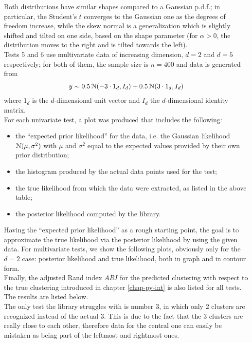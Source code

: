 Both distributions have similar shapes compared to a Gaussian p.d.f.; in particular, the Student's $t$ converges to the Gaussian one as the degrees of freedom increase, while the skew normal is a generalization which is slightly shifted and tilted on one side, based on the shape parameter (for $\alpha>0$, the distribution moves to the right and is tilted towards the left). \\
Tests 5 and 6 use multivariate data of increasing dimension, $d = 2$ and $d=5$ respectively; for both of them, the sample size is $n=400$ and data is generated from
$$y \sim 0.5 \, \mathcal N(-3 \cdot 1_d, I_d) + 0.5 \, \mathcal N(3 \cdot 1_d, I_d)$$
where $1_d$ is the $d$-dimensional unit vector and $I_d$ the $d$-dimensional identity matrix. \\
For each univariate test, a plot was produced that includes the following:
\begin{itemize}
	\item the ``expected prior likelihood'' for the data, i.e. the Gaussian likelihood $\mathcal N(\mu,\sigma^2)$ with $\mu$ and $\sigma^2$ equal to the expected values provided by their own prior distribution;
	\item the histogram produced by the actual data points used for the test;
	\item the true likelihood from which the data were extracted, as listed in the above table;
	\item the posterior likelihood computed by the library.
\end{itemize}
Having the ``expected prior likelihood'' as a rough starting point, the goal is to approximate the true likelihood via the posterior likelihood by using the given data.
For multivariate tests, we show the following plots, obviously only for the $d=2$ case: posterior likelihood and true likelihood, both in graph and in contour form. \\
Finally, the adjusted Rand index $ARI$ for the predicted clustering with respect to the true clustering introduced in chapter \ref{chap-py-int} is also listed for all tests.
The results are listed below. \\
The only test the library struggles with is number 3, in which only 2 clusters are recognized instead of the actual 3.
This is due to the fact that the 3 clusters are really close to each other, therefore data for the central one can easily be mistaken as being part of the leftmost and rightmost ones.
